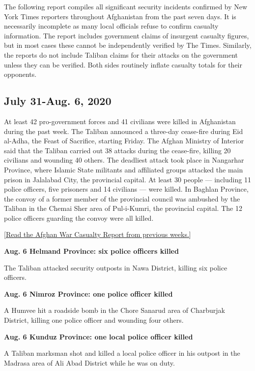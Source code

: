 The following report compiles all significant security incidents
confirmed by New York Times reporters throughout Afghanistan from the
past seven days. It is necessarily incomplete as many local officials
refuse to confirm casualty information. The report includes government
claims of insurgent casualty figures, but in most cases these cannot be
independently verified by The Times. Similarly, the reports do not
include Taliban claims for their attacks on the government unless they
can be verified. Both sides routinely inflate casualty totals for their
opponents.

\hypertarget{july-31-aug-6-2020}{%
\subsection{July 31-Aug. 6, 2020}\label{july-31-aug-6-2020}}

At least 42 pro-government forces and 41 civilians were killed in
Afghanistan during the past week. The Taliban announced a three-day
cease-fire during Eid al-Adha, the Feast of Sacrifice, starting Friday.
The Afghan Ministry of Interior said that the Taliban carried out 38
attacks during the cease-fire, killing 20 civilians and wounding 40
others. The deadliest attack took place in Nangarhar Province, where
Islamic State militants and affiliated groups attacked the main prison
in Jalalabad City, the provincial capital. At least 30 people ---
including 11 police officers, five prisoners and 14 civilians --- were
killed. In Baghlan Province, the convoy of a former member of the
provincial council was ambushed by the Taliban in the Chemai Sher area
of Pul-i-Kumri, the provincial capital. The 12 police officers guarding
the convoy were all killed.

{[}\href{https://www.nytimes.com/spotlight/afghan-war-casualty-reports}{Read
the Afghan War Casualty Report from previous weeks.}{]}

\textbf{Aug. 6 Helmand Province: six police officers killed}

The Taliban attacked security outposts in Nawa District, killing six
police officers.

\textbf{Aug. 6 Nimroz Province: one police officer killed}

A Humvee hit a roadside bomb in the Chore Sanarud area of Charburjak
District, killing one police officer and wounding four others.

\textbf{Aug. 6 Kunduz Province: one local police officer killed}

A Taliban marksman shot and killed a local police officer in his outpost
in the Madrasa area of Ali Abad District while he was on duty.

